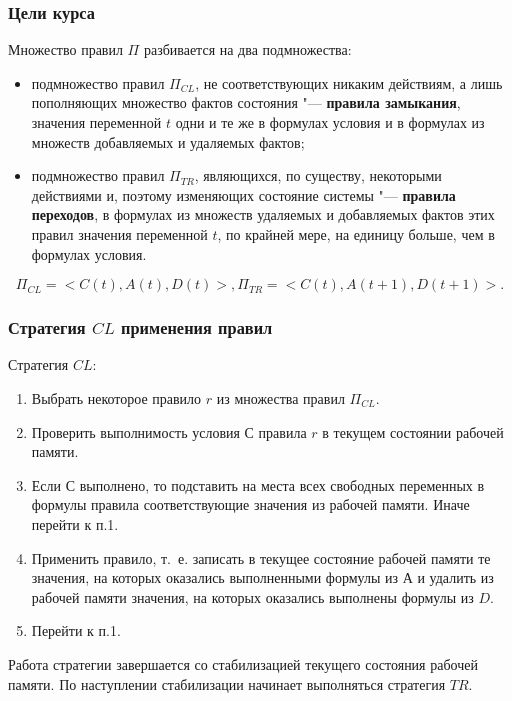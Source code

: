 \documentclass[default]{beamer}
\begin{document}
	\begin{frame}
		\frametitle{Цели курса}
		
		Множество правил $\Pi$ разбивается на два подмножества:
		\begin{itemize}
			\item подмножество правил $\Pi_{CL}$, не соответствующих никаким действиям, а лишь пополняющих множество фактов состояния "--- \textbf{правила  замыкания}, значения переменной $t$ одни и те же в формулах условия и в формулах из множеств добавляемых и удаляемых фактов;
			\item подмножество правил $\Pi_{TR}$, являющихся, по существу, некоторыми действиями и, поэтому изменяющих состояние системы "--- \textbf{правила переходов}, в формулах из множеств удаляемых и добавляемых фактов этих правил значения переменной $t$, по крайней мере, на единицу больше, чем в формулах условия.
		\end{itemize}

		\begin{equation}
			\Pi_{CL}= <C(t),A(t),D(t)>, \Pi_{TR} = <C(t),A(t+1),D(t+1)>.
		\end{equation}
	\end{frame}

	\begin{frame}
		\frametitle{Стратегия $CL$ применения правил}

		Стратегия $CL$:
		\begin{enumerate}
			\item Выбрать некоторое правило $r$ из множества правил $\Pi_{CL}$.
			\item Проверить выполнимость условия $С$ правила $r$ в текущем состоянии рабочей памяти.
			\item Если $С$ выполнено, то подставить на места всех свободных переменных в формулы правила соответствующие значения из рабочей памяти. Иначе перейти к п.1.
			\item  Применить правило, т.~е. записать в текущее состояние рабочей памяти те значения, на которых оказались выполненными формулы из $А$ и удалить из рабочей памяти значения, на которых оказались выполнены формулы из $D$.  
			\item Перейти к п.1.
		\end{enumerate}

		Работа стратегии завершается со стабилизацией текущего состояния рабочей памяти. По наступлении стабилизации начинает выполняться стратегия $TR$.		
	\end{frame}
\end{document}
